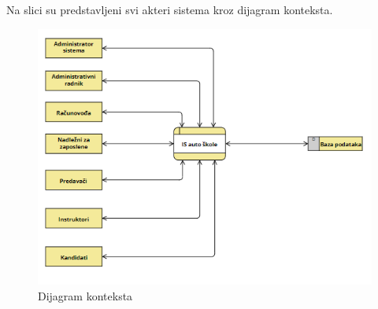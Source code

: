 Na slici  \label{fig:kontekst} su predstavljeni svi akteri sistema kroz dijagram konteksta.
\begin{figure}[H]
    \begin{center}
        \includegraphics[width=\textwidth]{Diagrams/dijagram_konteksta.png}
    \end{center}
    \caption {Dijagram konteksta}
    \label{fig:kontekst}

\end{figure}